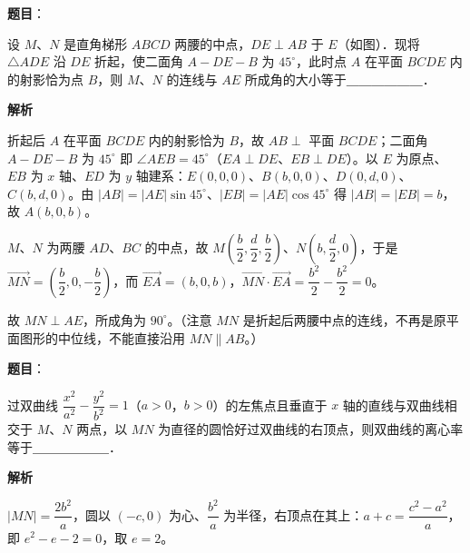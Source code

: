 \begin{answer}

\textbf{题目}：

设 $M$、$N$ 是直角梯形 $ABCD$ 两腰的中点，$DE \perp AB$ 于 $E$（如图）．现将 $\triangle ADE$ 沿 $DE$ 折起，使二面角 $A - DE - B$ 为 $45^\circ$，此时点 $A$ 在平面 $BCDE$ 内的射影恰为点 $B$，则 $M$、$N$ 的连线与 $AE$ 所成角的大小等于＿＿＿＿＿＿．
\nopagebreak[4]
\begin{center}\end{center}
\nopagebreak[4]
\textbf{解析}

折起后 $A$ 在平面 $BCDE$ 内的射影恰为 $B$，故 $AB \perp$ 平面 $BCDE$；二面角 $A-DE-B$ 为 $45^\circ$ 即 $\angle AEB = 45^\circ$（$EA \perp DE$、$EB \perp DE$）。以 $E$ 为原点、$EB$ 为 $x$ 轴、$ED$ 为 $y$ 轴建系：$E(0,0,0)$、$B(b,0,0)$、$D(0,d,0)$、$C(b,d,0)$。由 $|AB| = |AE|\sin 45^\circ$、$|EB| = |AE|\cos 45^\circ$ 得 $|AB| = |EB| = b$，故 $A(b,0,b)$。

$M$、$N$ 为两腰 $AD$、$BC$ 的中点，故 $M\left(\dfrac b2, \dfrac d2, \dfrac b2\right)$、$N\left(b, \dfrac d2, 0\right)$，于是 $\overrightarrow{MN} = \left(\dfrac b2, 0, -\dfrac b2\right)$，而 $\overrightarrow{EA} = (b, 0, b)$，$\overrightarrow{MN} \cdot \overrightarrow{EA} = \dfrac{b^2}{2} - \dfrac{b^2}{2} = 0$。

故 $MN \perp AE$，所成角为 $90^\circ$。（注意 $MN$ 是折起后两腰中点的连线，不再是原平面图形的中位线，不能直接沿用 $MN \parallel AB$。）


\end{answer}
\begin{answer}

\textbf{题目}：

过双曲线 $\dfrac{x^2}{a^2} - \dfrac{y^2}{b^2} = 1$（$a > 0$，$b > 0$）的左焦点且垂直于 $x$ 轴的直线与双曲线相交于 $M$、$N$ 两点，以 $MN$ 为直径的圆恰好过双曲线的右顶点，则双曲线的离心率等于＿＿＿＿＿＿．

\textbf{解析}

$|MN| = \dfrac{2b^2}{a}$，圆以 $(-c, 0)$ 为心、$\dfrac{b^2}{a}$ 为半径，右顶点在其上：$a + c = \dfrac{c^2 - a^2}{a}$，即 $e^2 - e - 2 = 0$，取 $e = 2$。


\end{answer}
